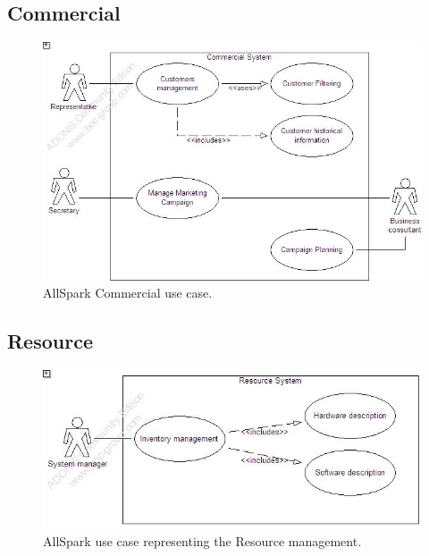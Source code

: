 \subsection{Commercial}
\begin{figure}
\begin{centering}
\includegraphics[scale=0.45]{assign3/adonis/imgs/commercial.jpg}
\caption{AllSpark Commercial use case.}
\label{2img:[use]commercial}
\end{centering}
\end{figure}

\subsection{Resource}
\begin{figure}
\begin{centering}
\includegraphics[scale=0.45]{assign3/adonis/imgs/resource.jpg}
\caption{AllSpark use case representing the Resource management.}
\label{2img:[use]resource}
\end{centering}
\end{figure}


